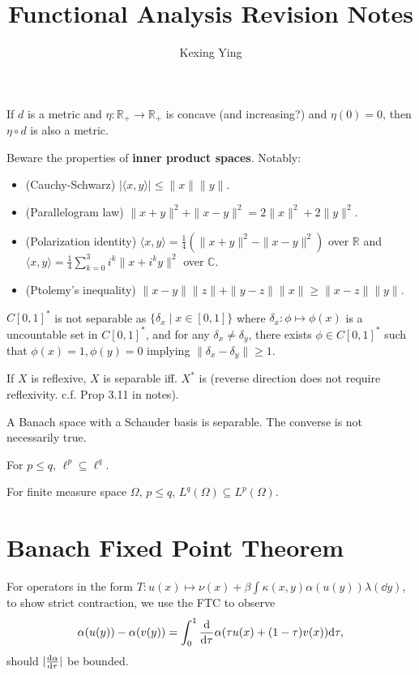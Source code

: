 \documentclass[]{article}
\title{Functional Analysis Revision Notes}
\author{Kexing Ying}
\theoremstyle{definition}
\begin{document}
\maketitle

If \(d\) is a metric and \(\eta : \mathbb{R}_+ \to \mathbb{R}_+\) is concave (and increasing?) and 
\(\eta(0) = 0\), then \(\eta \circ d\) is also a metric.

Beware the properties of \textbf{inner product spaces}. Notably: 
\begin{itemize}
  \item (Cauchy-Schwarz) \(|\langle x, y \rangle| \le \|x\|\|y\|\).
  \item (Parallelogram law) \(\|x + y\|^2  + \|x - y\|^2 = 2\|x\|^2 + 2\|y\|^2\).
  \item (Polarization identity) \(\langle x, y \rangle = \frac{1}{4}(\|x + y\|^2 - \|x - y\|^2)\) over \(\mathbb{R}\) 
    and \(\langle x, y \rangle = \frac{1}{4}\sum_{k = 0}^3 i^k\|x + i^ky\|^2\) over \(\mathbb{C}\).
  \item (Ptolemy's inequality) \(\|x - y\|\|z\| + \|y - z\| \|x\| \ge \|x- z\|\|y\|\).
\end{itemize}

\(C[0, 1]^*\) is not separable as \(\{\delta_x \mid x \in [0, 1]\}\) where \(\delta_x : \phi \mapsto \phi(x)\) 
is a uncountable set in \(C[0, 1]^*\), and for any \(\delta_x \neq \delta_y\), there exists 
\(\phi \in C[0, 1]^*\) such that \(\phi(x) = 1, \phi(y) = 0\) implying \(\|\delta_x - \delta_y\| \ge 1\). 

If \(X\) is reflexive, \(X\) is separable iff. \(X^*\) is (reverse direction does not require 
reflexivity. c.f. Prop 3.11 in notes). 

A Banach space with a Schauder basis is separable. The converse is not necessarily true.

For \(p \le q\), \(\ell^p \subseteq \ell^q\).

For finite measure space \(\Omega\), \(p \le q\), \(L^q(\Omega) \subseteq L^p(\Omega)\).

\section*{Banach Fixed Point Theorem}

For operators in the form \(T : u(x) \mapsto \nu(x) + \beta \int \kappa(x, y) \alpha(u(y)) \lambda(\dd y)\), 
to show strict contraction, we use the FTC to observe
\[\alpha(u(y)) - \alpha(v(y)) = \int_0^1 \dv{\tau}\alpha(\tau u(x) + (1 - \tau)v(x)) \dd \tau,\]
should \(|\dv{\alpha}{\tau}|\) be bounded.
\end{document}
